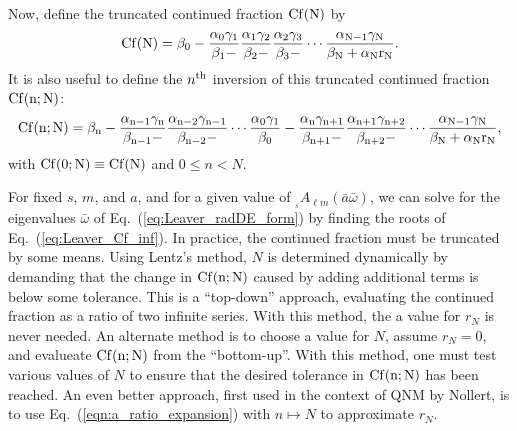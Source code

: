 \documentclass[11pt]{article}
\newcommand{\scA}[4][]{{}_{{}_{#2}}A^{#1}_{#3}(#4)}
\begin{document}
Now, define the truncated continued fraction $\rm{Cf}(N)$ by
\begin{equation}\label{eq:Leaver_Cf_N}
  \rm{Cf}(N) = \beta_0 -\frac{\alpha_0\gamma_1}{\beta_1-}
             \frac{\alpha_1\gamma_2}{\beta_2-}
             \frac{\alpha_2\gamma_3}{\beta_3-}\cdots
             \frac{\alpha_{N-1}\gamma_N}{\beta_N+\alpha_N r_N}.
\end{equation}
It is also useful to define the $n^{\rm th}$ inversion of this
truncated continued fraction $\rm{Cf}(n;N)$:
\begin{equation}\label{eq:Leaver_Cf_N_inv}
  \rm{Cf}(n;N) = \beta_n-\frac{\alpha_{n-1}\gamma_n}{\beta_{n-1}-}
                         \frac{\alpha_{n-2}\gamma_{n-1}}{\beta_{n-2}-}
                         \cdots\frac{\alpha_0\gamma_1}{\beta_0}
                         -\frac{\alpha_n\gamma_{n+1}}{\beta_{n+1}-}
                          \frac{\alpha_{n+1}\gamma_{n+2}}{\beta_{n+2}-}
                          \cdots\frac{\alpha_{N-1}\gamma_N}{\beta_N+\alpha_N r_N},
\end{equation}
with $\rm{Cf}(0;N)\equiv\rm{Cf}(N)$ and $0\le n<N$.

For fixed $s$, $m$, and $a$, and for a given value of
$\scA{s}{\ell{m}}{\bar{a}\bar\omega}$, we can solve for the
eigenvalues $\bar\omega$ of Eq.~(\ref{eq:Leaver_radDE_form}) by
finding the roots of Eq.~(\ref{eq:Leaver_Cf_inf}).  In practice, the
continued fraction must be truncated by some means.  Using Lentz's
method, $N$ is determined dynamically by demanding that the change in
$\rm{Cf}(n;N)$ caused by adding additional terms is below some
tolerance.  This is a ``top-down'' approach, evaluating the continued
fraction as a ratio of two infinite series.  With this method, the a
value for $r_N$ is never needed.  An alternate method is to choose a
value for $N$, assume $r_N=0$, and evalueate $\rm{Cf}(n;N)$ from the
``bottom-up''.  With this method, one must test various values of $N$
to ensure that the desired tolerance in $\rm{Cf}(n;N)$ has been
reached.  An even better approach, first used in the context of QNM by
Nollert, is to use Eq.~(\ref{eqn:a_ratio_expansion}) with $n\mapsto N$ to
approximate $r_N$.


\vspace*{0.5in}
\end{document}
